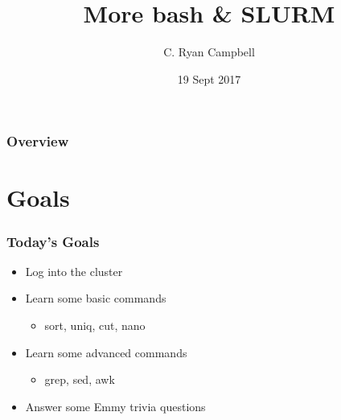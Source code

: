 \documentclass[14pt]{beamer}
\title[bash \& SLURM]{More bash \& SLURM} %
\author{C. Ryan Campbell} %
\institute[Duke] %
{
Duke University \\ %
\medskip
\textit{c.ryan.campbell@duke.edu} %
}
\date{19 Sept 2017} %
\begin{document}
\begin{frame}
\titlepage %
\end{frame}

\begin{frame}
\frametitle{Overview} %
\tableofcontents %
\end{frame}


\section{Goals} %

\begin{frame}
\frametitle{Today's Goals}
\begin{itemize}
	\item<+-> Log into the cluster
	\item<+-> Learn some basic commands
	\begin{itemize}
		\item<+-> sort, uniq, cut, nano
	\end{itemize}
	\item<+-> Learn some advanced commands
	\begin{itemize}
		\item<+-> grep, sed, awk
	\end{itemize}
	\item<+-> Answer some Emmy trivia questions
\end{itemize}
\end{frame}
\end{document}

